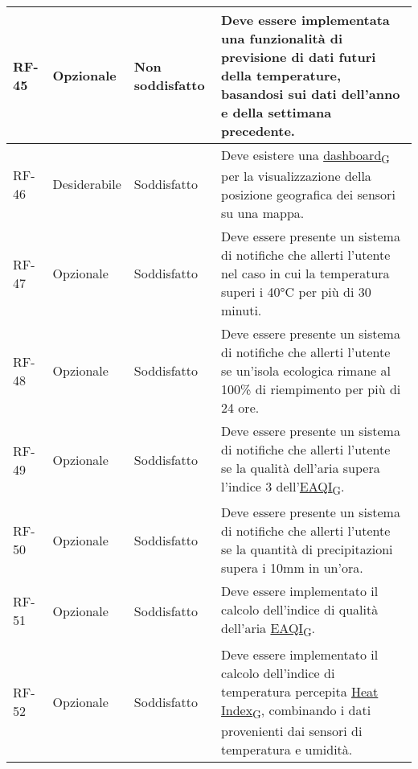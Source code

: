 \begin{longtable}{|>{\centering\arraybackslash}m{}|>{\centering\arraybackslash}m{}|>{\centering\arraybackslash}m{}|>{\centering\arraybackslash}m{}|}
	RF-45           & Opzionale           & Non soddisfatto & Deve essere implementata una funzionalità di previsione di dati futuri della temperature, basandosi sui dati dell'anno e della settimana precedente.
	\\\hline
	RF-46           & Desiderabile        & Soddisfatto & Deve esistere una \href{https://7last.github.io/docs/pb/documentazione-interna/glossario\#dashboard}{dashboard\textsubscript{G}} per la visualizzazione della posizione geografica dei sensori su una mappa.
	\\\hline
	RF-47           & Opzionale           & Soddisfatto & Deve essere presente un sistema di notifiche che allerti l'utente nel caso in cui la temperatura superi i 40°C per più di 30 minuti.
	\\\hline
	RF-48           & Opzionale           & Soddisfatto                                                                                                           & Deve essere presente un sistema di notifiche che allerti l'utente se un'isola ecologica rimane al 100\% di riempimento per più di 24 ore.
	\\\hline
	RF-49           & Opzionale           & Soddisfatto                                                                                                           & Deve essere presente un sistema di notifiche che allerti l'utente se la qualità dell'aria supera l'indice 3 dell'\href{https://7last.github.io/docs/pb/documentazione-interna/glossario\#european-air-quality-index}{EAQI\textsubscript{G}}.
	\\\hline
	RF-50           & Opzionale           & Soddisfatto                                                                                                           & Deve essere presente un sistema di notifiche che allerti l'utente se la quantità di precipitazioni supera i 10mm in un'ora.
	\\\hline
	RF-51           & Opzionale           & Soddisfatto                                                                                                           & Deve essere implementato il calcolo dell'indice di qualità dell'aria \href{https://7last.github.io/docs/pb/documentazione-interna/glossario\#european-air-quality-index}{EAQI\textsubscript{G}}.
	\\\hline
	RF-52           & Opzionale           & Soddisfatto                                                                                                           & Deve essere implementato il calcolo dell'indice di temperatura percepita \href{https://7last.github.io/docs/pb/documentazione-interna/glossario\#heat-index}{Heat Index\textsubscript{G}}, combinando i dati provenienti dai sensori di temperatura e umidità.

\end{longtable}
